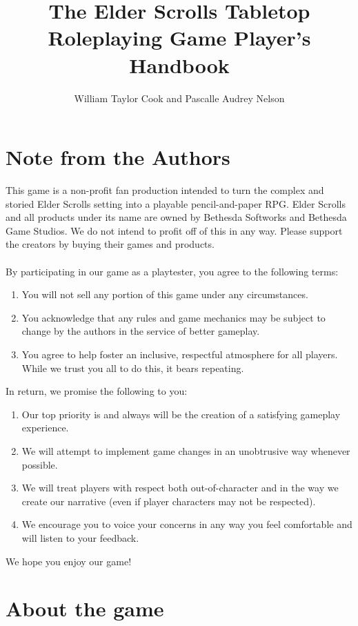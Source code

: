 \documentclass[12pt]{book}
\title{The Elder Scrolls Tabletop Roleplaying Game Player's Handbook}
\author{William Taylor Cook and Pascalle Audrey Nelson}
\begin{document}
\maketitle

\section*{Note from the Authors}
This game is a non-profit fan production intended to turn the complex and storied Elder Scrolls setting into a playable pencil-and-paper RPG. Elder Scrolls and all products under its name are owned by Bethesda Softworks and Bethesda Game Studios. We do not intend to profit off of this in any way. Please support the creators by buying their games and products.\\~\\
By participating in our game as a playtester, you agree to the following terms:

\begin{enumerate}
	\item You will not sell any portion of this game under any circumstances.
	\item You acknowledge that any rules and game mechanics may be subject to change by the authors in the service of better gameplay.
	\item You agree to help foster an inclusive, respectful atmosphere for all players. While we trust you all to do this, it bears repeating.
\end{enumerate}
In return, we promise the following to you:

\begin{enumerate}
	\item Our top priority is and always will be the creation of a satisfying gameplay experience.
	\item We will attempt to implement game changes in an unobtrusive way whenever possible.
	\item We will treat players with respect both out-of-character and in the way we create our narrative (even if player characters may not be respected).
	\item We encourage you to voice your concerns in any way you feel comfortable and will listen to your feedback.
\end{enumerate}
We hope you enjoy our game!
\newpage

\section*{About the game}
\end{document}
